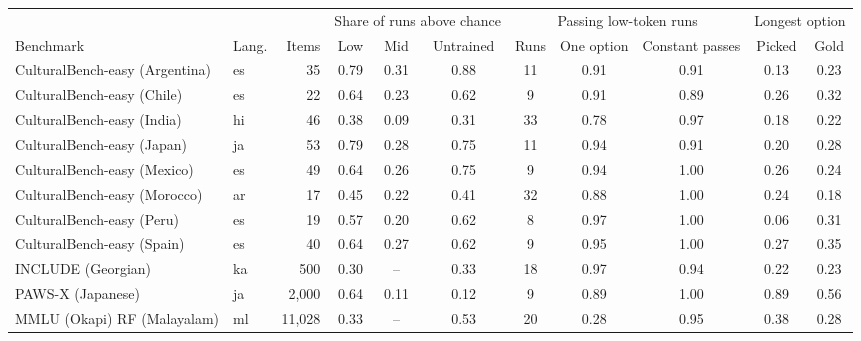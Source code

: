 \begin{tabular}{llrcccccccc}
\toprule
 & & & \multicolumn{3}{c}{Share of runs above chance} & \multicolumn{3}{c}{Passing low-token runs} & \multicolumn{2}{c}{Longest option} \\
\cmidrule(lr){4-6}\cmidrule(lr){7-9}\cmidrule(lr){10-11}
Benchmark & Lang. & Items & Low & Mid & Untrained & Runs & One option & Constant passes & Picked & Gold \\
\midrule
CulturalBench-easy (Argentina) & es & 35 & 0.79 & 0.31 & 0.88 & 11 & 0.91 & 0.91 & 0.13 & 0.23 \\
CulturalBench-easy (Chile) & es & 22 & 0.64 & 0.23 & 0.62 & 9 & 0.91 & 0.89 & 0.26 & 0.32 \\
CulturalBench-easy (India) & hi & 46 & 0.38 & 0.09 & 0.31 & 33 & 0.78 & 0.97 & 0.18 & 0.22 \\
CulturalBench-easy (Japan) & ja & 53 & 0.79 & 0.28 & 0.75 & 11 & 0.94 & 0.91 & 0.20 & 0.28 \\
CulturalBench-easy (Mexico) & es & 49 & 0.64 & 0.26 & 0.75 & 9 & 0.94 & 1.00 & 0.26 & 0.24 \\
CulturalBench-easy (Morocco) & ar & 17 & 0.45 & 0.22 & 0.41 & 32 & 0.88 & 1.00 & 0.24 & 0.18 \\
CulturalBench-easy (Peru) & es & 19 & 0.57 & 0.20 & 0.62 & 8 & 0.97 & 1.00 & 0.06 & 0.31 \\
CulturalBench-easy (Spain) & es & 40 & 0.64 & 0.27 & 0.62 & 9 & 0.95 & 1.00 & 0.27 & 0.35 \\
INCLUDE (Georgian) & ka & 500 & 0.30 & -- & 0.33 & 18 & 0.97 & 0.94 & 0.22 & 0.23 \\
PAWS-X (Japanese) & ja & 2{,}000 & 0.64 & 0.11 & 0.12 & 9 & 0.89 & 1.00 & 0.89 & 0.56 \\
MMLU (Okapi) RF (Malayalam) & ml & 11{,}028 & 0.33 & -- & 0.53 & 20 & 0.28 & 0.95 & 0.38 & 0.28 \\
\bottomrule
\end{tabular}
